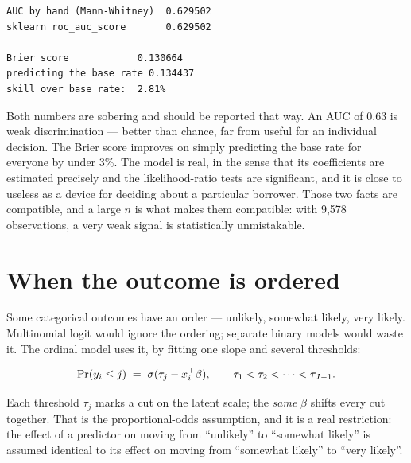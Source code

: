 \documentclass[
  letterpaper,
  10pt,
  twoside,
  openright,
  numbers=noenddot,
  chapterprefix=true]{scrbook}
\begin{document}
\begin{verbatim}
AUC by hand (Mann-Whitney)  0.629502
sklearn roc_auc_score       0.629502

Brier score            0.130664
predicting the base rate 0.134437
skill over base rate:  2.81%
\end{verbatim}

Both numbers are sobering and should be reported that way. An AUC of
0.63 is weak discrimination --- better than chance, far from useful for
an individual decision. The Brier score improves on simply predicting
the base rate for everyone by under 3\%. The model is real, in the sense
that its coefficients are estimated precisely and the likelihood-ratio
tests are significant, and it is close to useless as a device for
deciding about a particular borrower. Those two facts are compatible,
and a large \(n\) is what makes them compatible: with 9,578
observations, a very weak signal is statistically unmistakable.

\section{When the outcome is ordered}\label{when-the-outcome-is-ordered}

Some categorical outcomes have an order --- unlikely, somewhat likely,
very likely. Multinomial logit would ignore the ordering; separate
binary models would waste it. The ordinal model uses it, by fitting one
slope and several thresholds:

\[
\Pr(y_i \le j) \thickspace=\thickspace \sigma(\tau_j - x_i^\top\beta),
\qquad \tau_1 < \tau_2 < \dots < \tau_{J-1} .
\]

Each threshold \(\tau_j\) marks a cut on the latent scale; the
\emph{same} \(\beta\) shifts every cut together. That is the
proportional-odds assumption, and it is a real restriction: the effect
of a predictor on moving from ``unlikely'' to ``somewhat likely'' is
assumed identical to its effect on moving from ``somewhat likely'' to
``very likely''.
\end{document}
